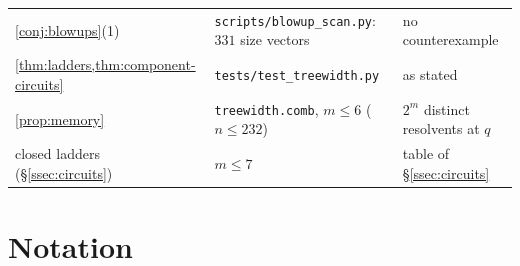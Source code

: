 \documentclass[final]{siamart0516}
\numberwithin{theorem}{section}
\numberwithin{equation}{section}
\theoremstyle{siamnonum}
\theoremstyle{plain}
\newcommand{\code}[1]{{\ttfamily\nolinkurl{#1}}}
\begin{document}
\begin{center}
\begin{longtable}{@{}L{0.25}L{0.43}L{0.25}@{}}
\cref{conj:blowups}(1) & \code{scripts/blowup_scan.py}: $331$ size vectors & no counterexample\\
\cref{thm:ladders,thm:component-circuits} & \code{tests/test_treewidth.py} & as stated\\
\cref{prop:memory} & \code{treewidth.comb}, $m\le6$ ($n\le232$) & $2^{m}$ distinct resolvents at $q$\\
closed ladders (\S\ref{ssec:circuits}) & $m\le7$ & table of \S\ref{ssec:circuits}\\
\bottomrule
\end{longtable}
\end{center}

\section{Notation}\label{app:notation}
\end{document}
